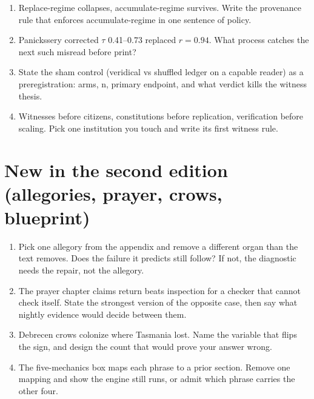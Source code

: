 \begin{enumerate}
\item Replace-regime collapses, accumulate-regime survives. Write the provenance rule that enforces accumulate-regime in one sentence of policy.
\item Panickssery corrected $\tau$ 0.41--0.73 replaced $r=0.94$. What process catches the next such misread before print?
\item State the sham control (veridical vs shuffled ledger on a capable reader) as a preregistration: arms, n, primary endpoint, and what verdict kills the witness thesis.
\item Witnesses before citizens, constitutions before replication, verification before scaling. Pick one institution you touch and write its first witness rule.
\end{enumerate}

\section*{New in the second edition (allegories, prayer, crows, blueprint)}

\begin{enumerate}
\item Pick one allegory from the appendix and remove a different organ than the text removes. Does the failure it predicts still follow? If not, the diagnostic needs the repair, not the allegory.
\item The prayer chapter claims return beats inspection for a checker that cannot check itself. State the strongest version of the opposite case, then say what nightly evidence would decide between them.
\item Debrecen crows colonize where Tasmania lost. Name the variable that flips the sign, and design the count that would prove your answer wrong.
\item The five-mechanics box maps each phrase to a prior section. Remove one mapping and show the engine still runs, or admit which phrase carries the other four.
\end{enumerate}
